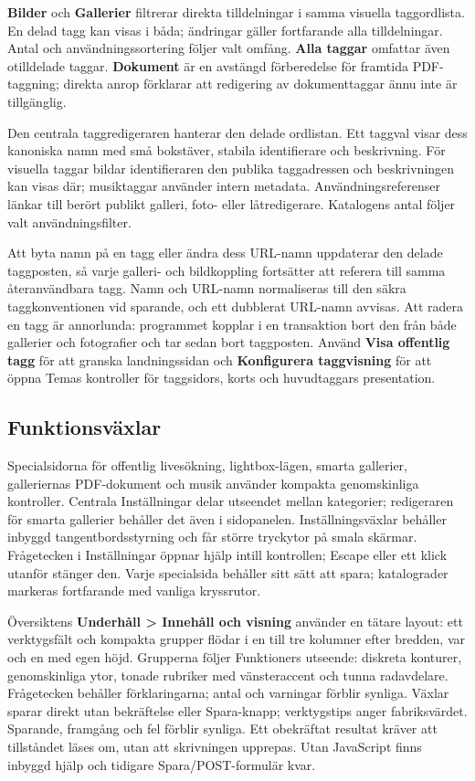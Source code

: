 \documentclass[11pt,a4paper]{article}
\newcommand{\ui}[1]{\textbf{#1}}
\begin{document}
\ui{Bilder} och \ui{Gallerier} filtrerar direkta tilldelningar i samma visuella
taggordlista. En delad tagg kan visas i båda; ändringar gäller fortfarande alla
tilldelningar. Antal och användningssortering följer valt omfång.
\ui{Alla taggar} omfattar även otilldelade taggar. \ui{Dokument} är en avstängd
förberedelse för framtida PDF-taggning; direkta anrop förklarar att
redigering av dokumenttaggar ännu inte är tillgänglig.

Den centrala taggredigeraren hanterar den delade ordlistan. Ett taggval visar
dess kanoniska namn med små bokstäver, stabila identifierare och beskrivning.
För visuella taggar bildar identifieraren den publika taggadressen och
beskrivningen kan visas där; musiktaggar använder intern metadata.
Användningsreferenser länkar till berört publikt galleri, foto- eller
låtredigerare. Katalogens antal följer valt användningsfilter.

Att byta namn på en tagg eller ändra dess URL-namn uppdaterar den delade
taggposten, så varje galleri- och bildkoppling fortsätter att referera till
samma återanvändbara tagg. Namn och URL-namn normaliseras till den säkra
taggkonventionen vid sparande, och ett dubblerat URL-namn avvisas. Att radera en
tagg är annorlunda: programmet kopplar i en transaktion bort den från både
gallerier och fotografier och tar sedan bort taggposten. Använd \ui{Visa
offentlig tagg} för att granska landningssidan och \ui{Konfigurera taggvisning}
för att öppna Temas kontroller för taggsidors, korts och huvudtaggars
presentation.

\subsection{Funktionsväxlar}

Specialsidorna för offentlig livesökning, lightbox-lägen, smarta gallerier,
galleriernas PDF-dokument och musik använder kompakta genomskinliga kontroller.
Centrala Inställningar delar utseendet mellan kategorier; redigeraren för
smarta gallerier behåller det även i sidopanelen. Inställningsväxlar behåller
inbyggd tangentbordsstyrning och får större tryckytor på smala skärmar.
Frågetecken i Inställningar öppnar hjälp intill kontrollen; Escape eller ett
klick utanför stänger den. Varje specialsida behåller sitt sätt att spara;
katalograder markeras fortfarande med vanliga kryssrutor.

Översiktens \ui{Underhåll > Innehåll och visning} använder en tätare layout:
ett verktygsfält och kompakta grupper flödar i en till tre kolumner
efter bredden, var och en med egen höjd. Grupperna följer Funktioners utseende:
diskreta konturer, genomskinliga ytor, tonade rubriker med vänsteraccent och
tunna radavdelare. Frågetecken behåller förklaringarna;
antal och varningar förblir synliga. Växlar sparar direkt utan bekräftelse
eller Spara-knapp; verktygstips anger fabriksvärdet. Sparande, framgång och
fel förblir synliga. Ett obekräftat resultat kräver att tillståndet läses om,
utan att skrivningen upprepas. Utan JavaScript finns inbyggd hjälp och tidigare
Spara/POST-formulär kvar.
\end{document}
